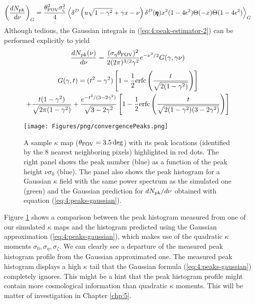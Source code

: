\begin{equation}
\label{eq:4:peak-estimator-2}
\left(\frac{dN_{\rm pk}}{d\nu}\right)_G = \frac{\theta^2_{\rm FOV}\sigma^2_\zeta}{4}\left\langle\delta^D\left(u\sqrt{1-\gamma^2}+\gamma x-\nu\right)\delta^D(\pmb{\eta})x^2(1-4\epsilon^2)\Theta(-x)\Theta(1-4\epsilon^2)\right\rangle_G
\end{equation}
%
Although tedious, the Gaussian integrals in (\ref{eq:4:peak-estimator-2}) can be performed explicitly \citep{BondCMB} to yield
%
\begin{equation}
\label{eq:4:peaks-gaussian}
\frac{dN_{\rm pk}(\nu)}{d\nu} = \frac{(\sigma_\eta\theta_{\rm FOV})^2}{2(2\pi)^{3/2} \gamma^2}e^{-\nu^2/2}G(\gamma,\gamma\nu)
\end{equation}
%
\begin{equation}
\label{eq:4:Gdef}
\begin{gathered}
G(\gamma,t) = (t^2-\gamma^2)\left[1-\frac{1}{2}{\rm erfc}\left(\frac{t}{\sqrt{2(1-\gamma^2)}}\right)\right] \\
+ \frac{t(1-\gamma^2)}{\sqrt{2\pi(1-\gamma^2)}} + \frac{e^{-t^2/(3-2\gamma^2)}}{\sqrt{3-2\gamma^2}}\left[1-\frac{1}{2}{\rm erfc}\left(\frac{t}{\sqrt{2(1-\gamma^2)(3-2\gamma^2)}}\right)\right]
\end{gathered}
\end{equation}
%
\begin{figure}
\begin{center}
\texttt{[image: Figures/png/convergencePeaks.png]}
\end{center}
\caption{A sample $\kappa$ map ($\theta_{\rm FOV}=3.5\,{\rm deg}$) with its peak locations (identified by the 8 nearest neighboring pixels) highlighted in red dots. The right panel shows the peak number (blue) as a function of the peak height $\nu\sigma_0$ (blue). The panel also shows the peak histogram for a Gaussian $\kappa$ field with the same power spectrum as the simulated one (green) and the Gaussian prediction for $dN_{\rm pk}/d\nu$ obtained with equation (\ref{eq:4:peaks-gaussian}).}
\label{fig:4:peaks}
\end{figure}
%
Figure \ref{fig:4:peaks} shows a comparison between the peak histogram measured from one of our simulated $\kappa$ maps and the histogram predicted using the Gaussian approximation (\ref{eq:4:peaks-gaussian}), which makes use of the quadratic $\kappa$ moments $\sigma_0,\sigma_\eta,\sigma_\zeta$. We can clearly see a departure of the measured peak histogram profile from the Gaussian approximated one. The measured peak histogram displays a high $\kappa$ tail that the Gaussian formula (\ref{eq:4:peaks-gaussian}) completely ignores. This might be a hint that the peak histogram profile might contain more cosmological information than quadratic $\kappa$ moments. This will be matter of investigation in Chapter \ref{chp:5}.    


